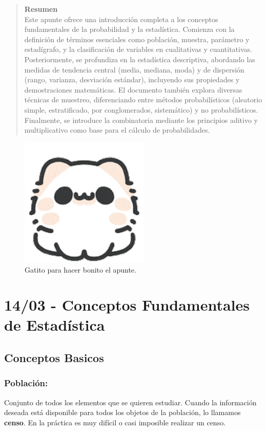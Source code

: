 \documentclass[12pt, letterpaper]{article}
\begin{document}
\begin{abstract}
    \noindent \textbf{Resumen} \\
    Este apunte ofrece una introducción completa a los conceptos fundamentales de la probabilidad y la estadística. Comienza con la definición de términos esenciales como población, muestra, parámetro y estadígrafo, y la clasificación de variables en cualitativas y cuantitativas. Posteriormente, se profundiza en la estadística descriptiva, abordando las medidas de tendencia central (media, mediana, moda) y de dispersión (rango, varianza, desviación estándar), incluyendo sus propiedades y demostraciones matemáticas. El documento también explora diversas técnicas de muestreo, diferenciando entre métodos probabilísticos (aleatorio simple, estratificado, por conglomerados, sistemático) y no probabilísticos. Finalmente, se introduce la combinatoria mediante los principios aditivo y multiplicativo como base para el cálculo de probabilidades.
\end{abstract}

\begin{figure}[htbp]
    \centering
    \includegraphics[width=0.55\textwidth]{gatito}
    \caption{Gatito para hacer bonito el apunte.}
    \label{fig:gatito}
\end{figure}
\newpage

\tableofcontents
\newpage %

\section{14/03 - Conceptos Fundamentales de Estadística}
\subsection{Conceptos Basicos}
\subsubsection{Población:} %
Conjunto de todos los elementos que se quieren estudiar. Cuando la información deseada está disponible para todos los objetos de la población, lo llamamos \textbf{censo}. En la práctica es muy difícil o casi imposible realizar un censo.
\end{document}

